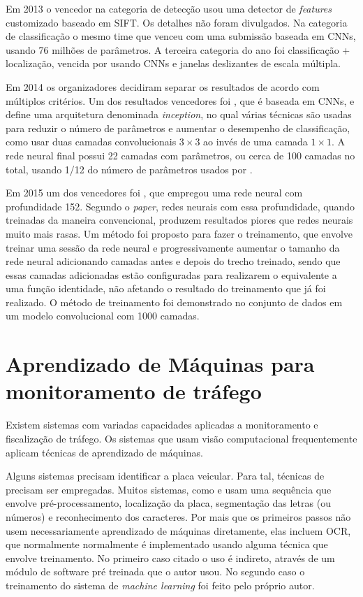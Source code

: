 Em 2013 o vencedor na categoria de detecção usou uma detector de
\emph{features}
customizado baseado em SIFT. Os detalhes não foram divulgados. Na categoria de
classificação o mesmo time que venceu com uma submissão baseada em CNNs, usando
76 milhões de parâmetros. A terceira categoria do ano foi classificação +
localização, vencida por \cite{sermanet2013overfeat} usando CNNs e janelas
deslizantes de escala múltipla.

Em 2014 os organizadores decidiram separar os resultados de acordo com
múltiplos critérios. Um dos resultados vencedores foi
\cite{szegedy2015going}, que é baseada em CNNs, e define uma arquitetura
denominada \emph{inception}, no qual várias técnicas são usadas para reduzir o
número de parâmetros e aumentar o desempenho de classificação, como usar
duas camadas convolucionais $3 \times 3$ ao invés de uma camada $1 \times 1$. A
rede neural final possui 22 camadas com parâmetros, ou cerca de 100 camadas no
total, usando 1/12 do número de parâmetros usados por
\cite{krizhevsky2012imagenet}.

Em 2015 um dos vencedores foi \cite{he2015deep}, que empregou uma rede neural
com profundidade 152. Segundo o \emph{paper}, redes neurais com essa
profundidade,
quando treinadas da maneira convencional, produzem resultados piores que redes
neurais muito mais rasas. Um método foi proposto para fazer o treinamento, que
envolve treinar uma sessão da rede neural e progressivamente aumentar o tamanho
da rede neural adicionando camadas antes e depois do trecho treinado, sendo que
essas camadas adicionadas estão configuradas para realizarem o equivalente a
uma função identidade, não afetando o resultado do treinamento que já foi
realizado. O método de treinamento foi demonstrado no conjunto de dados
 em um modelo
convolucional com 1000 camadas.

\section{Aprendizado de Máquinas para monitoramento de tráfego}

Existem sistemas com variadas capacidades aplicadas a monitoramento e
fiscalização de tráfego. Os sistemas que usam visão computacional
frequentemente aplicam técnicas de aprendizado de máquinas.

Alguns sistemas precisam identificar a placa veicular. Para tal, técnicas de
 precisam ser empregadas. Muitos sistemas, como
\cite{qadri2009automatic} e \cite{kranthi2011automatic} usam uma sequência que
envolve pré-processamento, localização da placa, segmentação das letras (ou
números) e reconhecimento dos caracteres. Por mais que os primeiros passos não
usem necessariamente aprendizado de máquinas diretamente, elas incluem OCR,
que normalmente normalmente é implementado usando alguma técnica que envolve
treinamento.
No primeiro caso citado o uso é indireto, através de um módulo de software
pré treinada que o autor usou. No segundo caso o treinamento do sistema de
\emph{machine learning} foi feito pelo próprio autor.

